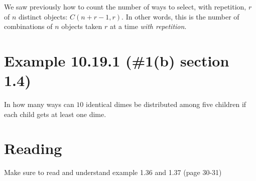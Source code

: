 \documentclass{article}
\begin{document}
We saw previously how to count the number of ways to select, with
repetition, $r$ of $n$ distinct objects: $C(n+r-1,r)$. In other words,
this is the number of combinations of $n$ objects taken $r$ at a time
\textit{with repetition}.

\section*{Example 10.19.1 (\#1(b) section 1.4)}

In how many ways can $10$ identical dimes be distributed among five
children if each child gets at least one dime.

\section*{Reading}

Make sure to read and understand example 1.36 and 1.37 (page 30-31)
\end{document}
